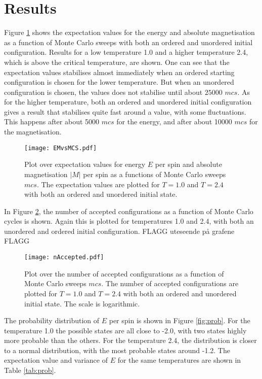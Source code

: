 \section{Results}
\label{sec:results}
Figure \ref{fig:EMvsMCS} shows the expectation values for the energy and absolute magnetisation as a function of Monte Carlo sweeps with both an ordered and unordered initial configuration. Results for a low temperature 1.0 and a higher temperature 2.4, which is above the critical temperature, are shown. One can see that the expectation values stabilises almost immediately when an ordered starting configuration is chosen for the lower temperature. But when an unordered configuration is chosen, the values does not stabilise until about $25000$ $mcs$. As for the higher temperature, both an ordered and unordered initial configuration gives a result that stabilises quite fast around a value, with some fluctuations. This happens after about 5000 $mcs$ for the energy, and after about 10000 $mcs$ for the magnetisation.   
\begin{figure}[htbp]
	\centering
	\texttt{[image: EMvsMCS.pdf]}
	\caption{Plot over expectation values for energy $E$ per spin and absolute magnetisation $|M|$ per spin as a functions of Monte Carlo sweeps $mcs$. The expectation values are plotted for $T=1.0$ and $T=2.4$ with both an ordered and unordered initial state.}
	\label{fig:EMvsMCS}
\end{figure}
In Figure \ref{fig:nAccepted}, the number of accepted configurations as a function of Monte Carlo cycles is shown. Again this is plotted for temperatures 1.0 and 2.4, with both an unordered and ordered initial configuration. FLAGG uteseende på grafene FLAGG
\begin{figure}[htbp]
	\centering
	\texttt{[image: nAccepted.pdf]}
	\caption{Plot over the number of accepted configurations as a function of Monte Carlo sweeps $mcs$. The number of accepted configurations are plotted for $T=1.0$ and $T=2.4$ with both an ordered and unordered initial state. The scale is logarithmic.}
	\label{fig:nAccepted}
\end{figure}
The probability distribution of $E$ per spin is shown in Figure \ref{fig:prob}. For the temperature 1.0 the possible states are all close to -2.0, with two states highly more probable than the others. For the temperature 2.4, the distribution is closer to a normal distribution, with the most probable states around -1.2. The expectation value and variance of $E$ for the same temperatures are shown in Table \ref{tab:prob}.
